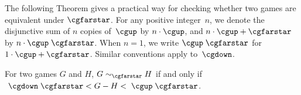 \documentclass[oneside,reqno]{amsart}
\newcommand{\cgfarstareq}[2]{{#1}\sim_{\cgfarstar}{#2}}
\begin{document}

    

    The following Theorem gives a practical way for checking whether two games are equivalent under $\cgfarstar$. For any positive integer~$n$, we denote the disjunctive sum of $n$ copies of~$\cgup$ by $n\cdot\cgup$, and $n\cdot\cgup+\cgfarstar$ by $n\cdot\cgup\;\cgfarstar$. When $n=1$, we write $\cgup\;\cgfarstar$ for $1\cdot\cgup+\cgfarstar$. Similar conventions apply to~$\cgdown$.
    

    \begin{theorem}\label{thm: check farstareq}
        For two games $G$ and $H$, $\cgfarstareq{G}{H}$ if and only if $~\cgdown\;\cgfarstar<G-H<\;\cgup\;\cgfarstar$.
    \end{theorem}
    
    
\end{document}

